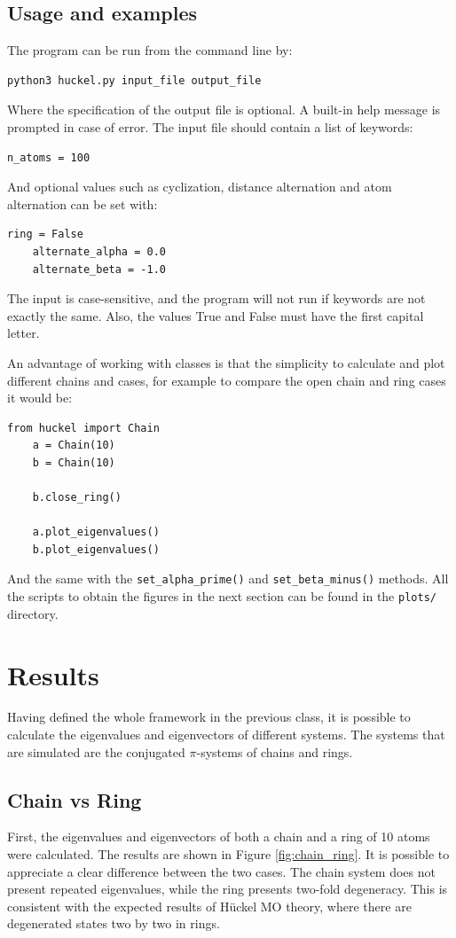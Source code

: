 \documentclass{article}
\begin{document}
\subsection{Usage and examples}
The program can be run from the command line by:
\begin{lstlisting}[backgroundcolor=\color{LightGray}]
    python3 huckel.py input_file output_file
\end{lstlisting} 
Where the specification of the output file is optional. A built-in help message is prompted in case of error. The input file should contain a list of keywords:

\begin{lstlisting}[backgroundcolor=\color{LightGray}]
    n_atoms = 100
\end{lstlisting} 
And optional values such as cyclization, distance alternation and atom alternation can be set with:
\begin{lstlisting}[backgroundcolor=\color{LightGray}]
    ring = False
    alternate_alpha = 0.0
    alternate_beta = -1.0
\end{lstlisting} 
The input is case-sensitive, and the program will not run if keywords are not exactly the same. Also, the values True and False must have the first capital letter.

An advantage of working with classes is that the simplicity to calculate and plot different chains and cases, for example to compare the open chain and ring cases it would be:
\begin{lstlisting}[backgroundcolor=\color{LightGray}]
    from huckel import Chain
    a = Chain(10)
    b = Chain(10)
    
    b.close_ring()
    
    a.plot_eigenvalues()
    b.plot_eigenvalues()
\end{lstlisting} 
And the same with the  \texttt{set\_alpha\_prime()} and \texttt{set\_beta\_minus()} methods. All the scripts to obtain the figures in the next section can be found in the \texttt{plots/} directory. 

\section{Results}
Having defined the whole framework in the previous class, it is possible to calculate the eigenvalues and eigenvectors of different systems. The systems that are simulated are the conjugated $\pi$-systems of chains and rings. 

\subsection{Chain vs Ring}
First, the eigenvalues and eigenvectors of both a chain and a ring of 10 atoms were calculated. The results are shown in Figure \ref{fig:chain_ring}. It is possible to appreciate a clear difference between the two cases. The chain system does not present repeated eigenvalues, while the ring presents two-fold degeneracy. This is consistent with the expected results of Hückel MO theory, where there are degenerated states two by two in rings. 
\end{document}
